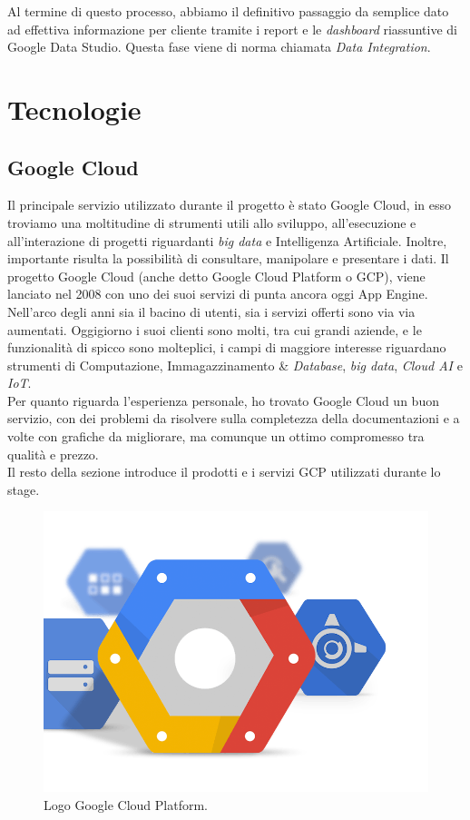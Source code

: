Al termine di questo processo, abbiamo il definitivo passaggio da semplice dato ad effettiva informazione per cliente tramite i report e le \emph{dashboard} riassuntive di Google Data Studio. Questa fase viene di norma chiamata \emph{Data Integration}.

\section{Tecnologie}
\subsection{Google Cloud}\label{GoogleCloud}
Il principale servizio utilizzato durante il progetto è stato Google Cloud, in esso troviamo una moltitudine di strumenti utili allo sviluppo, all'esecuzione e all'interazione di progetti riguardanti \emph{big data} e Intelligenza Artificiale. Inoltre, importante risulta la possibilità di consultare, manipolare e presentare i dati.
Il progetto Google Cloud (anche detto Google Cloud Platform o GCP), viene lanciato nel 2008 con uno dei suoi servizi di punta ancora oggi  \Gls{App Engine}. Nell'arco degli anni sia il bacino di utenti, sia i servizi offerti sono via via aumentati. Oggigiorno i suoi clienti \cite{clienti} sono molti, tra cui grandi aziende, e le funzionalità di spicco sono molteplici, i campi di maggiore interesse riguardano strumenti di Computazione, Immagazzinamento \& \emph{Database}, \emph{big data}, \emph{Cloud AI} e \emph{IoT}.
\\
Per quanto riguarda l'esperienza personale, ho trovato Google Cloud un buon servizio, con dei problemi da risolvere sulla completezza della documentazioni e a volte con grafiche da migliorare, ma comunque un ottimo compromesso tra qualità e prezzo.
\\
Il resto della sezione introduce il prodotti e i servizi GCP utilizzati durante lo stage.
\begin{figure}
	\centering
	\includegraphics[scale=0.3]{figures/google-cloud-platform}
	\caption[Logo Google Cloud Platform.]{Logo Google Cloud Platform.
		\label{fig:logoGCP}}
\end{figure}	
